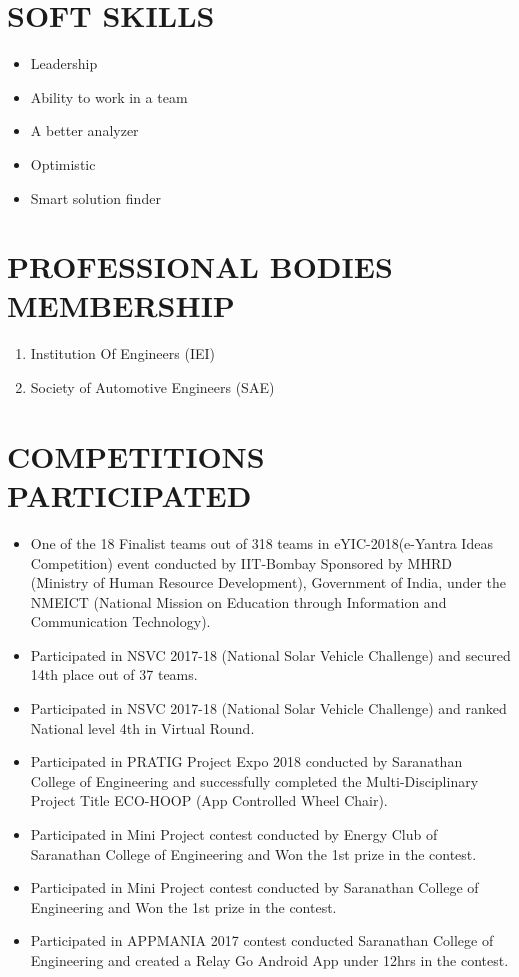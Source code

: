 \documentclass[margin,line]{res}
\begin{document}
\begin{resume}
\section{\sc SOFT SKILLS}
\begin{itemize}
\item Leadership
\item Ability to work in a team
\item A better analyzer
\item Optimistic
\item Smart solution finder
\end{itemize}

\section{\sc PROFESSIONAL BODIES MEMBERSHIP}
\begin{enumerate}
\item Institution Of Engineers (IEI)
\item Society of Automotive Engineers (SAE)
\end{enumerate}

\section{\sc COMPETITIONS PARTICIPATED}
\begin{itemize}
\item One of the 18 Finalist teams out of 318 teams in eYIC-2018(e-Yantra Ideas Competition) event conducted by IIT-Bombay Sponsored by MHRD (Ministry of Human Resource Development), Government of India, under the NMEICT (National Mission on Education through Information and Communication Technology).
\item Participated in NSVC 2017-18 (National Solar Vehicle Challenge) and secured 14th place out of 37 teams.
\item Participated in NSVC 2017-18 (National Solar Vehicle Challenge) and ranked National level 4th in Virtual Round.
\item Participated in PRATIG Project Expo 2018 conducted by Saranathan College of Engineering and successfully completed the Multi-Disciplinary Project Title ECO-HOOP (App Controlled Wheel Chair).
\item Participated in Mini Project contest conducted by Energy Club of Saranathan College of Engineering and Won the 1st prize in the contest.
\item Participated in Mini Project contest conducted by Saranathan College of Engineering and Won the 1st prize in the contest.
\item Participated in APPMANIA 2017 contest conducted Saranathan College of Engineering and created a Relay Go Android App under 12hrs in the contest.
\end{itemize}


\end{resume}
\end{document}

